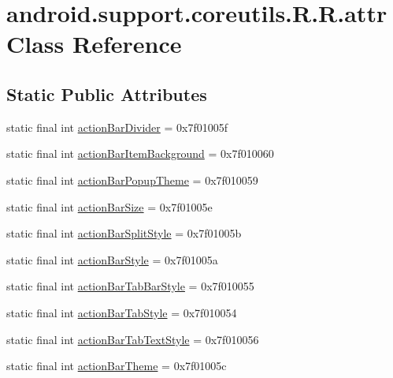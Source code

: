 \hypertarget{classandroid_1_1support_1_1coreutils_1_1_r_1_1attr}{
\section{android.support.coreutils.R.R.attr Class Reference}
\label{classandroid_1_1support_1_1coreutils_1_1_r_1_1attr}
}
\subsection*{Static Public Attributes}
\begin{CompactItemize}
\item 
static final int \hyperlink{classandroid_1_1support_1_1coreutils_1_1_r_1_1attr_fb0e6a2d5fab12cfcd720f14a0f9bc63}{actionBarDivider} = 0x7f01005f
\item 
static final int \hyperlink{classandroid_1_1support_1_1coreutils_1_1_r_1_1attr_e9117464811933168868b1719e976cdb}{actionBarItemBackground} = 0x7f010060
\item 
static final int \hyperlink{classandroid_1_1support_1_1coreutils_1_1_r_1_1attr_41e5cf1ffec6cfbe3c124bc3d33ead92}{actionBarPopupTheme} = 0x7f010059
\item 
static final int \hyperlink{classandroid_1_1support_1_1coreutils_1_1_r_1_1attr_1126d86ef16810528e2fe2dba2e4d38a}{actionBarSize} = 0x7f01005e
\item 
static final int \hyperlink{classandroid_1_1support_1_1coreutils_1_1_r_1_1attr_015c899e660368df80661750e1c4eb9d}{actionBarSplitStyle} = 0x7f01005b
\item 
static final int \hyperlink{classandroid_1_1support_1_1coreutils_1_1_r_1_1attr_487bbaf42bd039466ed2cfa6d81b561f}{actionBarStyle} = 0x7f01005a
\item 
static final int \hyperlink{classandroid_1_1support_1_1coreutils_1_1_r_1_1attr_ada0ea9359076ac78ea08a630664142c}{actionBarTabBarStyle} = 0x7f010055
\item 
static final int \hyperlink{classandroid_1_1support_1_1coreutils_1_1_r_1_1attr_9af3b49c39f9ceb066e62266284be787}{actionBarTabStyle} = 0x7f010054
\item 
static final int \hyperlink{classandroid_1_1support_1_1coreutils_1_1_r_1_1attr_fd549cfab4d51df1cc62c896ced31466}{actionBarTabTextStyle} = 0x7f010056
\item 
static final int \hyperlink{classandroid_1_1support_1_1coreutils_1_1_r_1_1attr_87a28f5a0f39a2e731985da493857359}{actionBarTheme} = 0x7f01005c

\end{CompactItemize}
